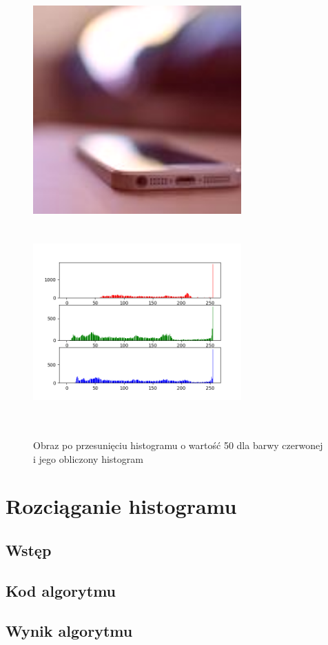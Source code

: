 \documentclass[a4paper,12pt]{book}
\begin{document}
\begin{figure}[H]
	\caption{Obraz po przesunięciu histogramu o wartość 50 dla barwy czerwonej i jego obliczony histogram}
	\includegraphics[width=8cm, height=8cm]{6-2/move-histogram-image-phone-(50,0,0).png}
	\includegraphics[width=8cm, height=8cm]{6-2/move-histogram-phone-(50,0,0).png}
\end{figure}

\section{Rozciąganie histogramu}
\subsection*{Wstęp}
\subsection*{Kod algorytmu}
\subsection*{Wynik algorytmu}
\end{document}
